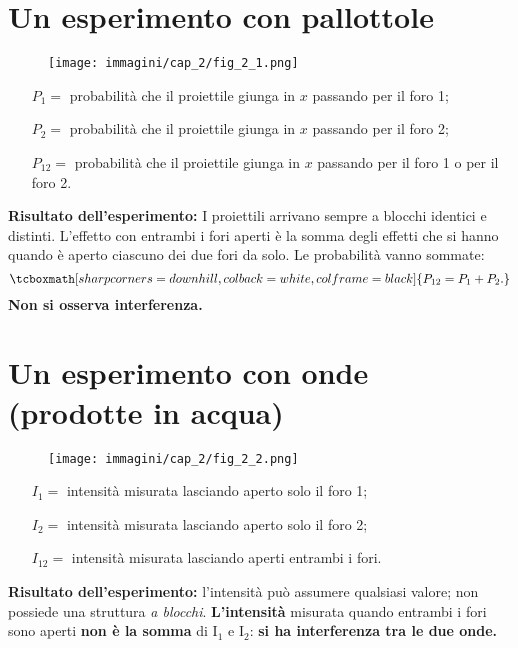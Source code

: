 \documentclass[a4paper,12pt,oneside]{book}
\begin{document}
\section*{Un esperimento con pallottole}
\begin{figure}[!htbp]
\begin{center}
\texttt{[image: immagini/cap\_2/fig\_2\_1.png]}
\end{center}
\end{figure}
\begin{itemize}
\item[$P_1=$ ]probabilità che il proiettile giunga in $x$ passando per il foro 1;
\item[$P_2=$ ]probabilità che il proiettile giunga in $x$ passando per il foro 2;
\item[$P_{12}=$ ]probabilità che il proiettile giunga in $x$ passando per il foro 1 o per il foro 2.
\end{itemize}
\textbf{Risultato dell'esperimento:} I proiettili arrivano sempre a blocchi identici e distinti. L'effetto con entrambi i fori aperti è la somma degli effetti che si hanno quando è aperto ciascuno dei due fori da solo. Le probabilità vanno sommate:
	\begin{equation}
		\tcboxmath[sharp corners=downhill, colback=white, colframe=black]{
			P_{12}=P_1+P_2.
			}
	\end{equation}
\textbf{Non si osserva interferenza.}
\newpage
\section*{Un esperimento con onde (prodotte in acqua)}
\begin{figure}[!htbp]
\begin{center}
\texttt{[image: immagini/cap\_2/fig\_2\_2.png]}
\end{center}
\end{figure}
\begin{itemize}
\item[$I_1=$ ]intensità misurata lasciando aperto solo il foro 1;
\item[$I_2=$ ]intensità misurata lasciando aperto solo il foro 2;
\item[$I_{12}=$ ]intensità misurata lasciando aperti entrambi i fori.
\end{itemize}
\textbf{Risultato dell'esperimento:} l'intensità  può assumere qualsiasi valore; non possiede una struttura \textit{a blocchi}. \textbf{L'intensità} misurata quando entrambi i fori sono aperti \textbf{non è la somma} di I$_1$ e I$_2$: \textbf{si ha interferenza tra le due onde.}
\end{document}

